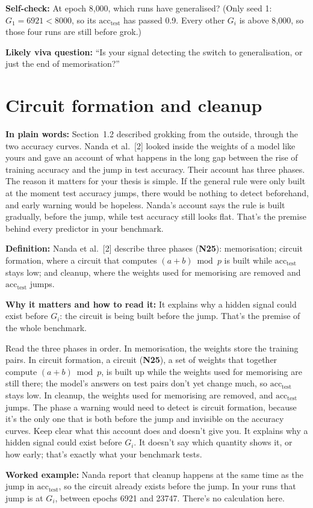 \documentclass[11pt,a4paper,oneside,openany]{report}
\newcommand{\acctest}{\mathrm{acc}_{\mathrm{test}}}
\newcommand{\gl}[1]{\textbf{#1}}   %
\newcommand{\fplain}{\textbf{In plain words:} }
\newcommand{\fdef}{\textbf{Definition:} }
\newcommand{\fread}{\par\textbf{Why it matters and how to read it:} }
\newcommand{\fex}{\par\textbf{Worked example:} }
\newcommand{\fself}{\par\textbf{Self-check:} }
\newcommand{\fviva}{\par\textbf{Likely viva question:} }
\begin{document}
\fself At epoch 8{,}000, which runs have generalised? (Only seed 1: $G_1 = 6921 < 8000$, so its $\acctest$ has passed 0.9. Every other $G_i$ is above 8{,}000, so those four runs are still before grok.)
\fviva ``Is your signal detecting the switch to generalisation, or just the end of memorisation?''

\section{Circuit formation and cleanup}
\fplain Section~1.2 described grokking from the outside, through the two accuracy curves. Nanda et al.\ [2] looked inside the weights of a model like yours and gave an account of what happens in the long gap between the rise of training accuracy and the jump in test accuracy. Their account has three phases. The reason it matters for your thesis is simple. If the general rule were only built at the moment test accuracy jumps, there would be nothing to detect beforehand, and early warning would be hopeless. Nanda's account says the rule is built gradually, before the jump, while test accuracy still looks flat. That's the premise behind every predictor in your benchmark.

\fdef Nanda et al.\ [2] describe three phases (\gl{N25}): memorisation; circuit formation, where a circuit that computes $(a+b) \bmod p$ is built while $\acctest$ stays low; and cleanup, where the weights used for memorising are removed and $\acctest$ jumps.
\fread It explains why a hidden signal could exist before $G_i$: the circuit is being built before the jump. That's the premise of the whole benchmark.

Read the three phases in order. In memorisation, the weights store the training pairs. In circuit formation, a circuit (\gl{N25}), a set of weights that together compute $(a+b) \bmod p$, is built up while the weights used for memorising are still there; the model's answers on test pairs don't yet change much, so $\acctest$ stays low. In cleanup, the weights used for memorising are removed, and $\acctest$ jumps. The phase a warning would need to detect is circuit formation, because it's the only one that is both before the jump and invisible on the accuracy curves. Keep clear what this account does and doesn't give you. It explains why a hidden signal could exist before $G_i$. It doesn't say which quantity shows it, or how early; that's exactly what your benchmark tests.

\fex Nanda report that cleanup happens at the same time as the jump in $\acctest$, so the circuit already exists before the jump. In your runs that jump is at $G_i$, between epochs 6921 and 23747. There's no calculation here.
\end{document}
